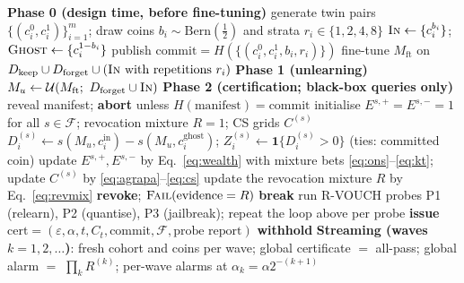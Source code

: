 \documentclass[pdflatex,sn-mathphys-num]{sn-jnl}
\theoremstyle{thmstyleone}
\theoremstyle{thmstyletwo}
\theoremstyle{thmstylethree}
\newcommand{\F}{\mathcal{F}}
\newcommand{\Ucal}{\mathcal{U}}
\newcommand{\Bern}{\mathrm{Bern}}
\newcommand{\eps}{\varepsilon}
\begin{document}
\begin{algorithm}[t]
\caption{The VOUCH protocol}\label{alg:vouch}
\begin{algorithmic}[1]
\Statex \textbf{Phase 0 (design time, before fine-tuning)}
\State generate twin pairs $\{(c_i^0, c_i^1)\}_{i=1}^m$; draw coins
       $b_i \sim \Bern(\tfrac12)$ and strata $r_i \in \{1,2,4,8\}$
\State $\textsc{In} \gets \{c_i^{b_i}\}$;\quad $\textsc{Ghost} \gets \{c_i^{1-b_i}\}$
\State publish $\mathrm{commit} = H(\{(c_i^0, c_i^1, b_i, r_i)\})$
\State fine-tune $M_{\mathrm{ft}}$ on $D_{\text{keep}} \cup D_{\text{forget}} \cup
       (\textsc{In} \text{ with repetitions } r_i)$
\Statex \textbf{Phase 1 (unlearning)}
\State $M_u \gets \Ucal(M_{\mathrm{ft}};\ D_{\text{forget}} \cup \textsc{In})$
\Statex \textbf{Phase 2 (certification; black-box queries only)}
\State reveal manifest; \textbf{abort} unless $H(\text{manifest}) = \mathrm{commit}$
\State initialise $E^{s,+} = E^{s,-} = 1$ for all $s \in \F$; revocation mixture
       $R = 1$; CS grids $C^{(s)}$
  \For{$s \in \F$}
     \State $D_i^{(s)} \gets s(M_u, c_i^{\text{in}}) - s(M_u, c_i^{\text{ghost}})$;
            \quad $Z_i^{(s)} \gets \mathbf{1}\{D_i^{(s)} > 0\}$ (ties: committed coin)
     \State update $E^{s,+}, E^{s,-}$ by Eq.~\eqref{eq:wealth} with mixture bets
            \eqref{eq:ons}--\eqref{eq:kt}; update $C^{(s)}$ by
            \eqref{eq:agrapa}--\eqref{eq:cs}
  \EndFor
  \State update the revocation mixture $R$ by Eq.~\eqref{eq:revmix}
   \textbf{revoke}; \Return
        $\textsc{Fail}(\text{evidence} = R)$
  \EndIf
   \textbf{break}
  \EndIf
\EndFor
\State run R-VOUCH probes P1 (relearn), P2 (quantise), P3 (jailbreak); repeat the
       loop above per probe
   \State \textbf{issue} $\mathrm{cert} = (\eps, \alpha, t, C_t, \mathrm{commit},
          \F, \text{probe report})$
\Else
   \State \textbf{withhold} 
\EndIf
\Statex \textbf{Streaming (waves $k = 1, 2, \dots$)}: fresh cohort and coins per wave;
        global certificate $=$ all-pass; global alarm $=$ $\prod_k R^{(k)}$; per-wave
        alarms at $\alpha_k = \alpha 2^{-(k+1)}$ 
\end{algorithmic}
\end{algorithm}
\end{document}
